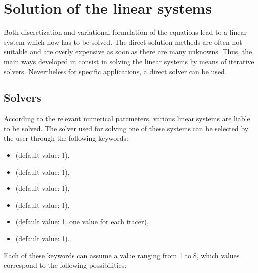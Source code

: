 \section{Solution of the linear systems}

Both discretization and variational formulation of the equations lead to a
linear system which now has to be solved. The direct solution methods are often
not suitable and are overly expensive as soon as there are many unknowns.
Thus, the main ways developed in  consist in solving the linear
systems by means of iterative solvers. Nevertheless for specific applications,
a direct solver can be used.


\subsection{Solvers}
\label{sec:solver}
According to the relevant numerical parameters, various linear systems are
liable to be solved. The solver used for solving one of these systems can be
selected by the user through the following keywords:

\begin{itemize}
\item {} (default value: 1),

\item {} (default value: 1),

\item {} (default value: 1),

\item {} (default value: 1),

\item {} (default value: 1, one value for
each tracer),

\item {}(default value: 1).
\end{itemize}

Each of these keywords can assume a value ranging from 1 to 8, which values
correspond to the following possibilities:

